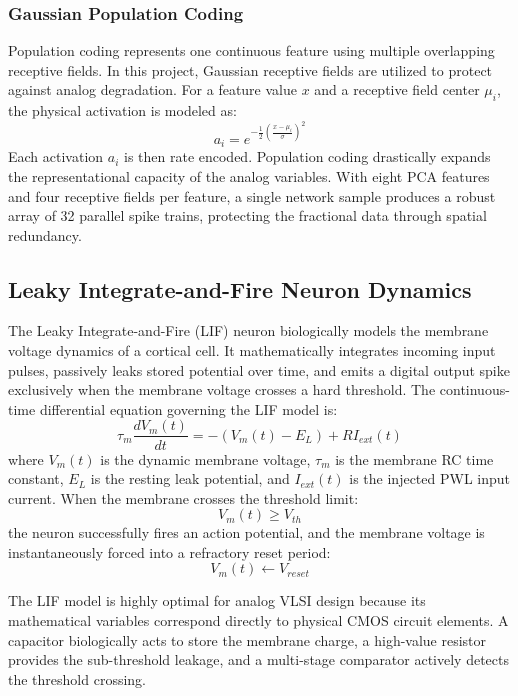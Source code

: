 \documentclass{ieeeaccess}
\begin{document}
\subsubsection{Gaussian Population Coding}
Population coding represents one continuous feature using multiple overlapping receptive fields. In this project, Gaussian receptive fields are utilized to protect against analog degradation. For a feature value $x$ and a receptive field center $\mu_i$, the physical activation is modeled as:
\begin{equation}
a_i = e^{-\frac{1}{2}\left(\frac{x-\mu_i}{\sigma}\right)^2}
\end{equation}
Each activation $a_i$ is then rate encoded. Population coding drastically expands the representational capacity of the analog variables. With eight PCA features and four receptive fields per feature, a single network sample produces a robust array of 32 parallel spike trains, protecting the fractional data through spatial redundancy.

\subsection{Leaky Integrate-and-Fire Neuron Dynamics}

The Leaky Integrate-and-Fire (LIF) neuron biologically models the membrane voltage dynamics of a cortical cell. It mathematically integrates incoming input pulses, passively leaks stored potential over time, and emits a digital output spike exclusively when the membrane voltage crosses a hard threshold. The continuous-time differential equation governing the LIF model is:
\begin{equation}
\tau_m \frac{dV_m(t)}{dt} = -(V_m(t) - E_L) + RI_{ext}(t)
\end{equation}
where $V_m(t)$ is the dynamic membrane voltage, $\tau_m$ is the membrane RC time constant, $E_L$ is the resting leak potential, and $I_{ext}(t)$ is the injected PWL input current. When the membrane crosses the threshold limit:
\begin{equation}
V_m(t) \geq V_{th}
\end{equation}
the neuron successfully fires an action potential, and the membrane voltage is instantaneously forced into a refractory reset period:
\begin{equation}
V_m(t) \leftarrow V_{reset}
\end{equation}

The LIF model is highly optimal for analog VLSI design because its mathematical variables correspond directly to physical CMOS circuit elements. A capacitor biologically acts to store the membrane charge, a high-value resistor provides the sub-threshold leakage, and a multi-stage comparator actively detects the threshold crossing.
\end{document}
